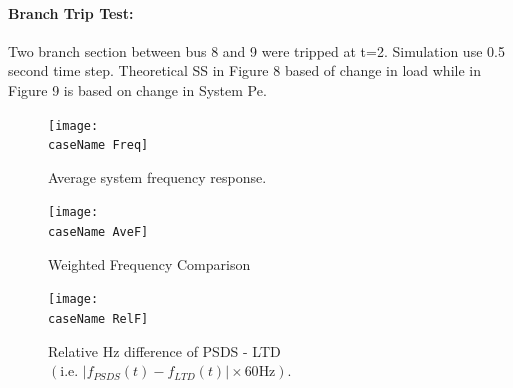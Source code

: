 \documentclass[12pt]{article}
\begin{document}
\pagebreak
\renewcommand{\caseName}{SixMachineBTrip0}
\paragraph{Branch Trip Test:} Two branch section between bus 8 and 9 were tripped at t=2. Simulation use 0.5 second time step. Theoretical SS in Figure 8 based of change in load while in Figure 9 is based on change in System Pe.
	\begin{figure}[h!]
			\centering
			\texttt{[image: \\caseName Freq]}\vspace{-.5em}
			\caption{Average system frequency response.}
			\label{\caseName F}		 
	\end{figure}%


	\begin{figure}[h!]
			\centering
			\texttt{[image: \\caseName AveF]}\vspace{-.5em}
			\caption{Weighted Frequency Comparison}
			\label{\caseName Vm}		 
	\end{figure}%

	\begin{figure}[h!]
			\centering
			\texttt{[image: \\caseName RelF]}\vspace{-.5em}
			\caption{Relative Hz difference of PSDS - LTD $\left( \text{i.e. }  \left|f_{PSDS}(t)- f_{LTD}(t)\right| \times 60 \text{Hz} \right)$.}
			\label{\caseName Va}		 
	\end{figure}%


%
\pagebreak
\end{document}
